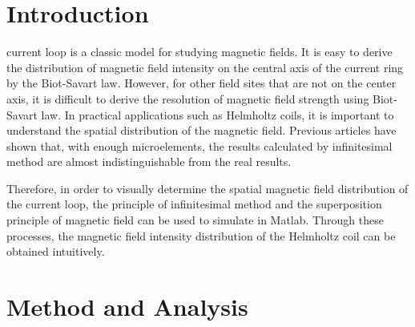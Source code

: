 \documentclass[journal,twocolumn,letterpaper]{IEEEJERM}
\begin{document}
\IEEEpeerreviewmaketitle


\section{Introduction}

 current loop is a classic model for studying magnetic fields. It is easy to derive the distribution of magnetic field intensity on the central axis of the current ring by the Biot-Savart law. However, for other field sites that are not on the center axis, it is difficult to derive the resolution of magnetic field strength using Biot-Savart law. In practical applications such as Helmholtz coils, it is important to understand the spatial distribution of the magnetic field. Previous articles have shown that, with enough microelements, the results calculated by infinitesimal method are almost indistinguishable from the real results. \cite{num1}

Therefore, in order to visually determine the spatial magnetic field distribution of the current loop, the principle of infinitesimal method and  the superposition principle of magnetic field can be used to simulate in Matlab. Through these processes, the magnetic field intensity distribution of the Helmholtz coil can be obtained intuitively.


\section{Method and Analysis}
\end{document}
